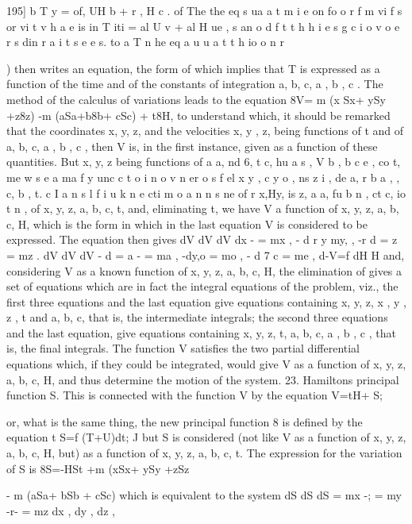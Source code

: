 \documentclass[12pt,a4paper]{article}
\theoremstyle{definition}
\begin{document}

195]
b T y = of, UH b + r , H c . of The the eq s ua a t m i e on fo o r f m vi f s or vi t v h a e is in T iti = al U v + al H ue , s an o d f t t h h i e s g c i o v o e r s din r a i t s e e s. to a T n he eq a u u a t t h io o n r
{)
then writes
an equation, the form of which implies that T is expressed as a function of the time
and of the constants of integration a, b, c, a , b , c . The method of the calculus of
variations leads to the equation
8V= m
(x
Sx+
ySy
+z8z) -m (aSa+b8b+
cSc)
+
t8H,
to understand which, it should be remarked that the coordinates x, y, z, and the
velocities x, y , z, being functions of t and of a, b, c, a , b , c , then V is, in the
first instance, given as a function of these quantities. But x, y, z being functions of
a a, nd 6, t c, hu a s , V b , b c e , co t, me w s e a ma f y unc c t o i n o v n er o s f el x y , c y o , ns z i , de a, r b a , , c, b , t. c I a n s l f i u k n e cti m o a n n s ne of r x,Hy, is z, a a, fu b n , ct c, io t n ,
of x, y, z, a, b, c, t, and, eliminating t, we have V a function of x, y, z, a, b, c, H, which
is the form in which in the last equation V is considered to be expressed. The equation
then gives
dV dV dV
dx - = mx , - d r y my, , -r d = z = mz .
dV dV dV
- d = a - = ma , -dy,o = mo , - d 7 c = me ,
d-V=f
dH
H
and, considering V as a known function of x, y, z, a, b, c, H, the elimination of
gives a set of equations which are in fact the integral equations of the problem,
viz., the first three equations and the last equation give equations containing
x, y, z, x , y , z , t and a, b, c, that is, the intermediate integrals; the second three
equations and the last equation, give equations containing x, y, z, t, a, b, c, a , b , c ,
that is, the final integrals.
The function V satisfies the two partial differential equations
which, if they could be integrated, would give V as a function of x, y, z, a, b, c, H,
and thus determine the motion of the system.
23. Hamiltons principal function S. This is connected with the function V by
the equation
V=tH+
S;



or, what is the same thing, the new principal function 8 is defined by the equation
t
S=f (T+U)dt;
J
but S is considered (not like V as a function of x, y, z, a, b, c, H, but) as a
function of x, y, z, a, b, c, t. The expression for the variation of S is
8S=-HSt +m (xSx+ ySy +zSz} - m (aSa+ bSb + cSc)
which is equivalent to the system
dS dS dS
= mx -; = my -r- = mz
dx , dy , dz ,
\end{document}
